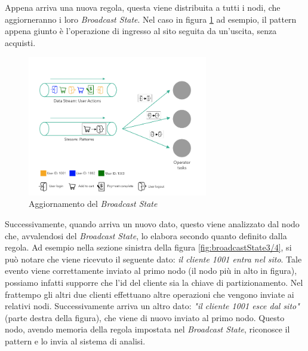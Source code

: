 Appena arriva una nuova regola, questa viene distribuita a tutti i nodi, che aggiorneranno i loro \textit{Broadcast State}.
Nel caso in figura \ref{fig:broadcastState2} ad esempio, il pattern appena giunto è l'operazione di ingresso al sito seguita da un'uscita, senza acquisti.
\begin{figure}[H]
    \centering
    \includegraphics[width=0.7\textwidth]{images/EventExport/broadcastState2.png}
    \caption{Aggiornamento del \textit{Broadcast State}}
    \label{fig:broadcastState2}
\end{figure}
Successivamente, quando arriva un nuovo dato, questo viene analizzato dal nodo che, avvalendosi del \textit{Broadcast State}, lo elabora secondo quanto definito dalla regola.
Ad esempio nella sezione sinistra della figura \ref{fig:broadcastState3/4}, si può notare che viene ricevuto il seguente dato: \textit{il cliente 1001 entra nel sito}.
Tale evento viene correttamente inviato al primo nodo (il nodo più in alto in figura), possiamo infatti supporre che l'id del cliente sia la chiave di partizionamento.
Nel frattempo gli altri due clienti effettuano altre operazioni che vengono inviate ai relativi nodi.
Successivamente arriva un altro dato: \textit{"il cliente 1001 esce dal sito"} (parte destra della figura), che viene di nuovo inviato al primo nodo.
Questo nodo, avendo memoria della regola impostata nel \textit{Broadcast State}, riconosce il pattern e lo invia al sistema di analisi.
